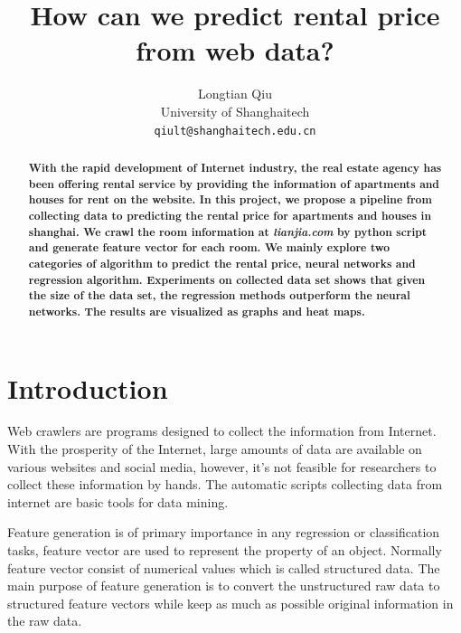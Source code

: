\documentclass[final]{cvpr}
\begin{document}
\title{How can we predict rental price from web data?}

\author{
Longtian Qiu\\
University of Shanghaitech\\
{\tt\small qiult@shanghaitech.edu.cn}
}

\maketitle


\begin{abstract}
\textbf{With the rapid development of Internet industry, the real estate agency has been offering rental service by providing the information of apartments and houses for rent on the website. In this project, we propose a pipeline from collecting data to predicting the rental price for apartments and houses in shanghai. We crawl the room information at \textit{lianjia.com} by python script and generate feature vector for each room. We mainly explore two categories of algorithm to predict the rental price, neural networks and regression algorithm. Experiments on collected data set shows that given the size of the data set, the regression methods outperform the neural networks. The results are visualized as graphs and heat maps.}
\end{abstract}

\section{Introduction}
Web crawlers are programs designed to collect the information from Internet. With the prosperity of the Internet, large amounts of data are available on various websites and social media, however, it's not feasible for researchers to collect these information by hands. The automatic scripts collecting data from internet are basic tools for data mining.

Feature generation is of primary importance in any regression or classification tasks, feature vector are used to represent the property of an object. Normally feature vector consist of numerical values which is called structured data. The main purpose of feature generation is to convert the unstructured raw data to structured feature vectors while keep as much as possible original information in the raw data.
\end{document}
